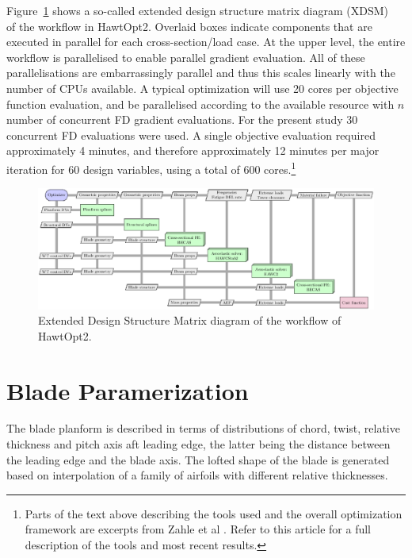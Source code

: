 Figure~\ref{fig:xdsm} shows a so-called extended design structure matrix diagram (XDSM)~\cite{Lambe2012} of the workflow in HawtOpt2.
Overlaid boxes indicate components that are executed in parallel for each cross-section/load case.
At the upper level, the entire workflow is parallelised to enable parallel gradient evaluation.
All of these parallelisations are embarrassingly parallel and thus this scales linearly with the number of CPUs available.
A typical optimization will use 20 cores per objective function evaluation, and be parallelised according to the available resource with $n$ number of concurrent FD gradient evaluations.
For the present study 30 concurrent FD evaluations were used. A single objective evaluation required approximately 4 minutes, and therefore approximately 12 minutes per major iteration for 60 design variables, using a total of 600 cores.\footnote{Parts of the text above describing the tools used and the overall optimization framework are excerpts from Zahle et al \cite{zahle2016}. Refer to this article for a full description of the tools and most recent results.}

\begin{figure}[!ht]
\begin{center}
	\includegraphics[width=1\linewidth]{figures/hawtopt2_xdsm.eps}
\end{center}
\caption{Extended Design Structure Matrix diagram of the workflow of HawtOpt2.}
\label{fig:xdsm}
\end{figure}


\section{Blade Paramerization}
\label{sec:blade_params}

The blade planform is described in terms of distributions of chord, twist, relative thickness and pitch axis aft leading edge, the latter being the distance between the leading edge and the blade axis.
The lofted shape of the blade is generated based on interpolation of a family of airfoils with different relative thicknesses.

